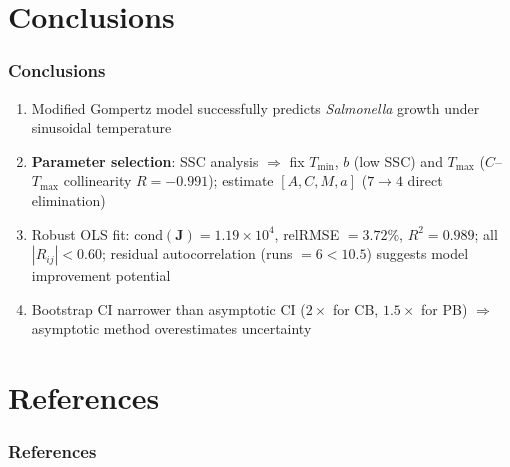 \documentclass[10pt,aspectratio=169]{beamer}
\begin{document}
\section{Conclusions}
\begin{frame}
	\frametitle{Conclusions}
	\begin{enumerate}
		\item Modified Gompertz model successfully predicts \textit{Salmonella} growth under sinusoidal temperature
		\item \textbf{Parameter selection}: SSC analysis $\Rightarrow$ fix $T_{\min}$, $b$ (low SSC) and $T_{\max}$ ($C$--$T_{\max}$ collinearity $R=-0.991$); estimate $[A, C, M, a]$ ($7 \to 4$ direct elimination)
		\item Robust OLS fit: $\text{cond}(\mathbf{J})=1.19\times10^4$, relRMSE $= 3.72\%$, $R^2 = 0.989$; all $|R_{ij}| < 0.60$; residual autocorrelation (runs $= 6 < 10.5$) suggests model improvement potential
		\item Bootstrap CI narrower than asymptotic CI ($2\times$ for CB, $1.5\times$ for PB) $\Rightarrow$ asymptotic method overestimates uncertainty
	\end{enumerate}
\end{frame}

\section{References}
\begin{frame}[allowframebreaks]
    \frametitle{References}
\end{frame}
\end{document}
